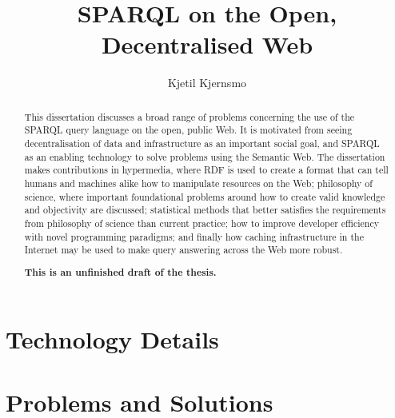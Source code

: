 \documentclass[a4paper, 12pt, draft]{uiophd}
\begin{document}
\title{SPARQL on the Open, Decentralised Web}
\author{Kjetil Kjernsmo}


\frontmatter
\maketitle


\begin{abstract}
  This dissertation discusses a broad range of problems concerning the
  use of the SPARQL query language on the open, public Web. It is
  motivated from seeing decentralisation of data and infrastructure as
  an important social goal, and SPARQL as an enabling technology to
  solve problems using the Semantic Web. The dissertation makes
  contributions in hypermedia, where RDF is used to create a format
  that can tell humans and machines alike how to manipulate resources
  on the Web; philosophy of science, where important foundational
  problems around how to create valid knowledge and objectivity are
  discussed; statistical methods that better satisfies the
  requirements from philosophy of science than current practice; how
  to improve developer efficiency with novel programming paradigms;
  and finally how caching infrastructure in the Internet may be used
  to make query answering across the Web more robust.

  \textbf{This is an unfinished draft of the thesis.}
\end{abstract}

\tableofcontents
\mainmatter






\chapter{Technology Details}



\chapter{Problems and Solutions}








\end{document}
